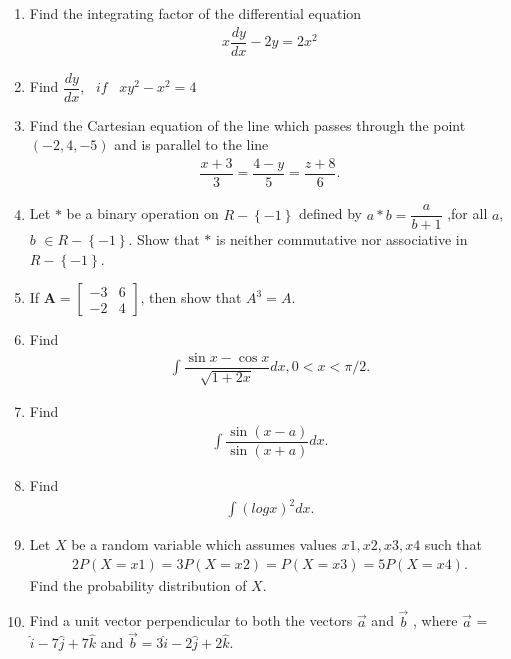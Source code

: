 \documentclass[12pt,-letter paper]{article}
\let\vec\mathbf{}
\let\vec\mathbf{}
\let\vec\mathbf{}
\providecommand{\myvec}[1]{\ensuremath{\begin{bmatrix}#1\end{bmatrix}}}
\providecommand{\cbrak}[1]{\ensuremath{\left\{#1\right\}}}
\providecommand{\brak}[1]{\ensuremath{\left(#1\right)}}
\begin{document}
\begin{enumerate}
\item Find the integrating factor of the differential equation 
\begin{align*}
x\dfrac{dy}{dx}-2y  = 2x^{2}
\end{align*}

\item Find $\dfrac{dy}{dx}$,  $\hspace{6pt}  if  \hspace{6pt} $    $xy^{2}-x^{2} = 4$

\item Find the Cartesian equation of the line which passes through the point $\brak{- 2, 4,-5}$ and is parallel to the line 
\begin{align*}
\dfrac{x+3}{3}=\dfrac{4-y}{5}=\dfrac{z+8}{6}.
\end{align*}

\item Let $*$ be a binary operation on $R-\cbrak{-1}$ defined by $a * b = \dfrac{a}{b+1}$ ,for all $a$, $b$ $\in R -\cbrak{-1}$.
Show that $*$ is neither commutative nor associative in $R-\cbrak{-1}$.

\item If $\vec{A} = \myvec{-3&6\\-2&4}$, then show that $A^3= A$.

\item Find
\begin{align*}
    \int \dfrac{\sin x - \cos x}{\sqrt{1+2x}} dx , 0 < x < {\pi/2}.
    \end{align*}
    
    \item Find
    \begin{align*}
\int \dfrac{\sin \brak{x-a}}{\sin\brak{x+a}} dx.
    \end{align*}
    
\item Find 
\begin{align*}
    \int \brak{logx}^2 dx.
\end{align*}

\item Let $X$ be a random variable which assumes values $x1, x2, x3, x4$ such that 
\begin{align*}
2P\brak{X = x1} = 3P\brak{X = x2} = P\brak{X = x3} = 5P\brak{X = x4}.
\end{align*}
Find the probability distribution of $X$.

\item Find a unit vector perpendicular to both the vectors 
$ \overrightarrow a $ and $ \overrightarrow b $ , where $ \overrightarrow a $ = $\hat{i} -7\hat{j} +7\hat{k}$ and $ \overrightarrow b = 3 \hat{i} -2 \hat{j}+ 2 \hat{k}$.


\end{enumerate}
\end{document}
